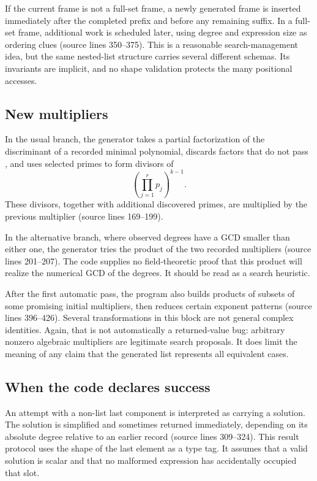 \documentclass[11pt,letterpaper]{article}
\newcommand{\code}[1]{\texttt{\detokenize{#1}}}
\newcommand{\src}[1]{\textnormal{(source lines #1)}}
\theoremstyle{definition}
\begin{document}
If the current frame is not a full-set frame, a newly generated frame is inserted
immediately after the completed prefix and before any remaining suffix. In a
full-set frame, additional work is scheduled later, using degree and expression
size as ordering clues \src{350--375}. This is a reasonable search-management
idea, but the same nested-list structure carries several different schemas.
Its invariants are implicit, and no shape validation protects the many positional
accesses.

\subsection{New multipliers}
In the usual branch, the generator takes a partial factorization of the
discriminant of a recorded minimal polynomial, discards factors that do not pass
\code{PrimeQ}, and uses selected primes to form divisors of
\begin{equation}\label{eq:divisorgrid}
 \left(\prod_{j=1}^{r}p_j\right)^{k-1}.
\end{equation}
These divisors, together with additional discovered primes, are multiplied by the
previous multiplier \src{169--199}.

In the alternative branch, where observed degrees have a GCD smaller than either
one, the generator tries the product of the two recorded multipliers
\src{201--207}. The code supplies no field-theoretic proof that this product will
realize the numerical GCD of the degrees. It should be read as a search heuristic.

After the first automatic pass, the program also builds products of subsets of
some promising initial multipliers, then reduces certain exponent patterns
\src{396--426}. Several transformations in this block are not general complex
identities. Again, that is not automatically a returned-value bug: arbitrary
nonzero algebraic multipliers are legitimate search proposals. It does limit the
meaning of any claim that the generated list represents all equivalent cases.

\subsection{When the code declares success}
An attempt with a non-list last component is interpreted as carrying a solution.
The solution is simplified and sometimes returned immediately, depending on its
absolute degree relative to an earlier record \src{309--324}. This result protocol
uses the shape of the last element as a type tag. It assumes that a valid solution
is scalar and that no malformed expression has accidentally occupied that slot.
\end{document}
